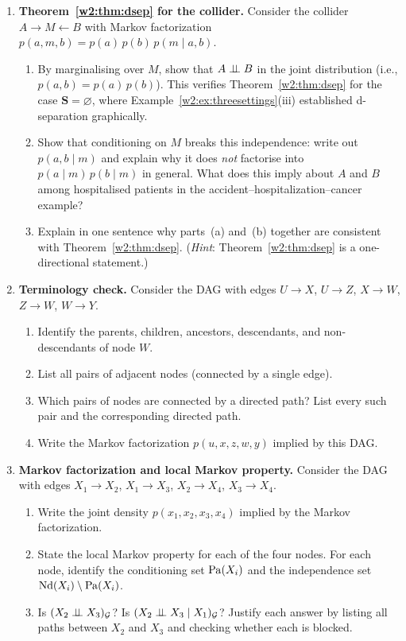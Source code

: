 \documentclass[master.tex]{subfiles}
\begin{document}
\begin{enumerate}[label=\textbf{\arabic*.}, leftmargin=*, itemsep=10pt]
  \item \textbf{Theorem~\ref{w2:thm:dsep} for the collider.}
  Consider the collider $A \to M \leftarrow B$ with Markov factorization
  $p(a, m, b) = p(a)\,p(b)\,p(m \mid a, b)$.
  \begin{enumerate}[label=(\alph*)]
    \item By marginalising over $M$, show that $A \perp\!\!\!\perp B$
          in the joint distribution (i.e., $p(a,b) = p(a)\,p(b)$).
          This verifies Theorem~\ref{w2:thm:dsep} for the case
          $\mathbf{S} = \varnothing$, where
          Example~\ref{w2:ex:threesettings}(iii) established d-separation
          graphically.
    \item Show that conditioning on $M$ breaks this independence: write
          out $p(a, b \mid m)$ and explain why it does \emph{not} factorise
          into $p(a \mid m)\,p(b \mid m)$ in general.  What does this imply
          about $A$ and $B$ among hospitalised patients in the
          accident--hospitalization--cancer example?
    \item Explain in one sentence why parts~(a) and~(b) together are
          consistent with Theorem~\ref{w2:thm:dsep}.  (\emph{Hint}:
          Theorem~\ref{w2:thm:dsep} is a one-directional statement.)
  \end{enumerate}

  \item \textbf{Terminology check.}
  Consider the DAG with edges $U \to X$, $U \to Z$, $X \to W$,
  $Z \to W$, $W \to Y$.
  \begin{enumerate}[label=(\alph*)]
    \item Identify the parents, children, ancestors, descendants, and
          non-descendants of node $W$.
    \item List all pairs of adjacent nodes (connected by a single edge).
    \item Which pairs of nodes are connected by a directed path?
          List every such pair and the corresponding directed path.
    \item Write the Markov factorization $p(u, x, z, w, y)$ implied by
          this DAG.
  \end{enumerate}

  \item \textbf{Markov factorization and local Markov property.}
  Consider the DAG with edges $X_1 \to X_2$, $X_1 \to X_3$,
  $X_2 \to X_4$, $X_3 \to X_4$.
  \begin{enumerate}[label=(\alph*)]
    \item Write the joint density $p(x_1, x_2, x_3, x_4)$ implied by the
          Markov factorization.
    \item State the local Markov property for each of the four nodes.
          For each node, identify the conditioning set $\mathrm{Pa}(X_i)$ and
          the independence set $\mathrm{Nd}(X_i) \setminus \mathrm{Pa}(X_i)$.
    \item Is $(X_2 \perp\!\!\!\perp X_3)_{\mathcal{G}}$?  Is $(X_2 \perp\!\!\!\perp X_3 \mid X_1)_{\mathcal{G}}$?
          Justify each answer by listing all paths between $X_2$ and $X_3$
          and checking whether each is blocked.
  \end{enumerate}


\end{enumerate}
\end{document}
